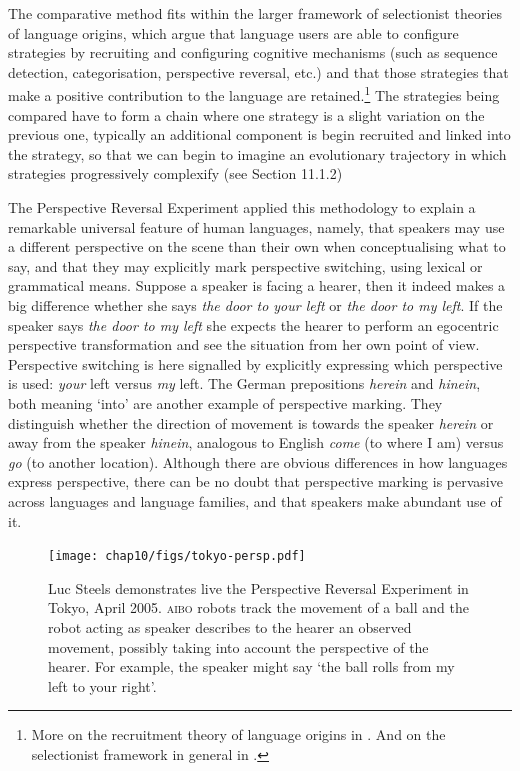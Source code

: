 The comparative method fits within the larger framework of selectionist theories  
of language origins, which argue that language users are able to configure strategies by recruiting and configuring 
cognitive mechanisms (such as sequence detection, categorisation, perspective reversal, etc.) and that those 
strategies that make a positive contribution to the language are retained.\footnote{
More on the recruitment theory of language origins in \cite{Steels:2007recruitment}. 
And on the selectionist framework in general in \cite{Steels:2012}.}
The strategies being compared have to form a chain where one strategy is a slight variation on the previous one, typically 
an additional component is begin recruited and linked into the strategy, so that we can begin to imagine an 
evolutionary trajectory in which strategies progressively complexify (see Section 11.1.2)

The Perspective Reversal Experiment applied this methodology to explain a remarkable universal feature 
of human languages, namely, 
that speakers may use a different perspective on the scene than their own when 
conceptualising what to say, and that they may explicitly mark perspective switching, using lexical or grammatical means. Suppose
a speaker is facing a hearer, then it indeed makes a big difference whether she says 
\emph{the door to your left}  or \emph{the door to my left}. If the speaker says
\emph{the door to my left} she expects the hearer to perform an egocentric
perspective transformation and see the situation from her own point of view. Perspective switching is here signalled by 
explicitly expressing which perspective is used: {\itshape your} left versus {\itshape my} left. 
The German prepositions \emph{herein} and \emph{hinein}, both meaning `into' are another example of perspective marking. They
distinguish whether the direction of movement is 
towards the speaker \emph{herein} or away from the speaker \emph{hinein}, analogous to English \emph{come} (to where I am) 
versus \emph{go} (to another location). Although there are obvious differences in how languages express
perspective, there can be no doubt that perspective marking is pervasive across 
languages and language families, and that speakers make abundant use of it. 

\begin{figure}[htbp]
  \centerline{\texttt{[image: chap10/figs/tokyo-persp.pdf]}}
\caption{\label{fig:tokyo-persp}Luc Steels demonstrates live the Perspective Reversal Experiment in Tokyo, April 2005. \textsc{aibo} robots track 
the movement of a ball and 
the robot acting as speaker describes to the hearer an observed movement, possibly taking into account the 
perspective of the hearer. For example, the speaker might say `the ball rolls from my left to your right'.}
\end{figure}

